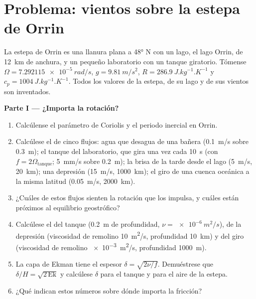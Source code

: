 \section{Problema: vientos sobre la estepa de Orrin}

\begin{problem}
\label{pb:b3:gfd-foundations:1}
La estepa de Orrin es una llanura plana a \ang{48} N con un lago, el lago Orrin,
de \qty{12}{km} de anchura, y un pequeño laboratorio con un tanque giratorio. Tómense
$\Omega = \qty{7.292115e-5}{rad/s}$, $g = \qty{9.81}{m/s^2}$, $R =
\qty{286.9}{J.kg^{-1}.K^{-1}}$ y $c_p = \qty{1004}{J.kg^{-1}.K^{-1}}$.
Todos los valores de la estepa, de su lago y de sus vientos son inventados.

\medskip\noindent\textbf{Parte I --- ¿Importa la rotación?}
\begin{enumerate}
\item Calcúlense el parámetro de Coriolis y el periodo inercial en Orrin.
\item Calcúlese el  de cinco flujos: agua que desagua de una bañera
  (\qty{0.1}{m/s} sobre \qty{0.3}{m}); el tanque del laboratorio, que gira
  una vez cada \qty{10}{s} (con $f = 2\Omega_{\text{tanque}}$; \qty{5}{mm/s}
  sobre \qty{0.2}{m}); la brisa de la tarde desde el lago (\qty{5}{m/s},
  \qty{20}{km}); una depresión (\qty{15}{m/s}, \qty{1000}{km}); el giro de una
  cuenca oceánica a la misma latitud (\qty{0.05}{m/s}, \qty{2000}{km}).
\item ¿Cuáles de estos flujos sienten la rotación que los impulsa, y cuáles están
  próximos al equilibrio geostrófico?
\item Calcúlese el  del tanque (\qty{0.2}{m} de profundidad, $\nu =
  \qty{e-6}{m^2/s}$), de la depresión (viscosidad de remolino \qty{10}{m^2/s},
  profundidad \qty{10}{km}) y del giro (viscosidad de remolino \qty{e-3}{m^2/s},
  profundidad \qty{1000}{m}).
\item La capa de Ekman tiene el espesor $\delta = \sqrt{2\nu/f}$. Demuéstrese que
  $\delta/H = \sqrt{2\,\mathrm{Ek}}$ y calcúlese $\delta$ para el tanque y para
  el aire de la estepa.
\item ¿Qué indican estos números sobre dónde importa la fricción?
\end{enumerate}


\end{problem}

